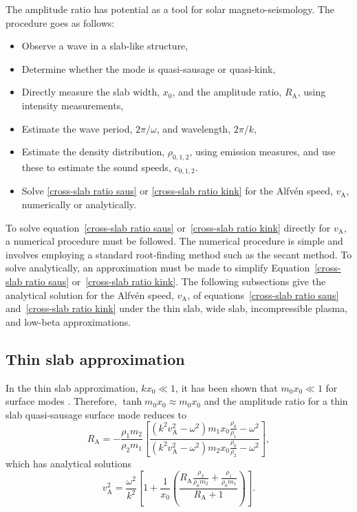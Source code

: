 \documentclass[namedreferences]{solarphysics}
\numberwithin{equation}{section}
\begin{document}
\begin{article}
The amplitude ratio has potential as a tool for solar magneto-seismology. The procedure goes as follows:
\begin{itemize}
\item Observe a wave in a slab-like structure,
\item Determine whether the mode is quasi-sausage or quasi-kink,
\item Directly measure the slab width, $x_0$, and the amplitude ratio, $R_\textrm{A}$, using intensity measurements,
\item Estimate the wave period, $2\pi / \omega$, and wavelength, $2\pi / k$,
\item Estimate the density distribution, $\rho_{0,1,2}$, using emission measures, and use these to estimate the sound speeds, $c_{0,1,2}$.
\item Solve \eqref{cross-slab ratio saus} or \eqref{cross-slab ratio kink} for the Alfv\'{e}n speed, $v_\textrm{A}$, numerically or analytically.
\end{itemize}

To solve equation~\eqref{cross-slab ratio saus} or~\eqref{cross-slab ratio kink} directly for $v_\textrm{A}$, a numerical procedure must be followed. The numerical procedure is simple and involves employing a standard root-finding method such as the secant method. To solve analytically, an approximation must be made to simplify Equation~\eqref{cross-slab ratio saus} or~\eqref{cross-slab ratio kink}. The following subsections give the analytical solution for the Alfv\'{e}n speed, $v_\textrm{A}$, of equations~\eqref{cross-slab ratio saus} and~\eqref{cross-slab ratio kink} under the thin slab, wide slab, incompressible plasma, and low-beta approximations.


\subsection{Thin slab approximation} \label{sec: AR thin slab}
In the thin slab approximation, $kx_0 \ll 1$, it has been shown that $m_0x_0 \ll 1$ for surface modes \citep{rob81b}. Therefore, $\tanh{m_0x_0} \approx m_0x_0$ and the amplitude ratio for a thin slab quasi-sausage surface mode reduces to
\begin{equation}
R_\textrm{A} = -\frac{\rho_1m_2}{\rho_2m_1}\left[\frac{(k^2v_\textrm{A}^2-\omega^2)m_1x_0\frac{\rho_0}{\rho_1}-\omega^2}{(k^2v_\textrm{A}^2-\omega^2)m_2x_0\frac{\rho_0}{\rho_2}-\omega^2}\right], 
\end{equation}
which has analytical solutions
\begin{equation}
v_\textrm{A}^2 = \frac{\omega^2}{k^2} \left[1 + \frac{1}{x_0}\left(\frac{R_\textrm{A}\frac{\rho_2}{\rho_0m_2} + \frac{\rho_1}{\rho_0m_1}}{R_\textrm{A} + 1}\right)\right].
\end{equation}


\end{article}
\end{document}
